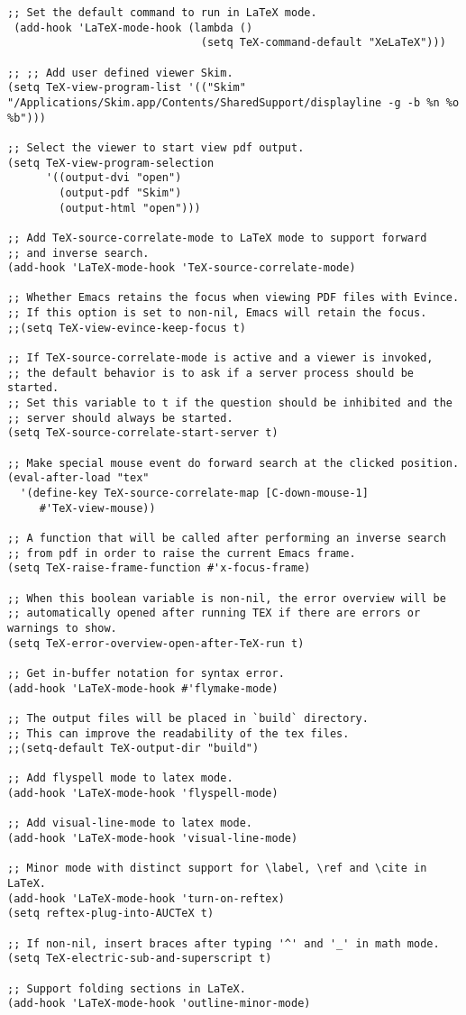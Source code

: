 \begin{lstlisting}
;; Set the default command to run in LaTeX mode.
 (add-hook 'LaTeX-mode-hook (lambda ()
                              (setq TeX-command-default "XeLaTeX")))

;; ;; Add user defined viewer Skim.
(setq TeX-view-program-list '(("Skim" "/Applications/Skim.app/Contents/SharedSupport/displayline -g -b %n %o %b")))

;; Select the viewer to start view pdf output.
(setq TeX-view-program-selection
      '((output-dvi "open")
        (output-pdf "Skim")
        (output-html "open")))

;; Add TeX-source-correlate-mode to LaTeX mode to support forward 
;; and inverse search.
(add-hook 'LaTeX-mode-hook 'TeX-source-correlate-mode)

;; Whether Emacs retains the focus when viewing PDF files with Evince.
;; If this option is set to non-nil, Emacs will retain the focus.
;;(setq TeX-view-evince-keep-focus t)

;; If TeX-source-correlate-mode is active and a viewer is invoked,
;; the default behavior is to ask if a server process should be started.
;; Set this variable to t if the question should be inhibited and the
;; server should always be started.
(setq TeX-source-correlate-start-server t)

;; Make special mouse event do forward search at the clicked position.
(eval-after-load "tex"
  '(define-key TeX-source-correlate-map [C-down-mouse-1]
     #'TeX-view-mouse))

;; A function that will be called after performing an inverse search
;; from pdf in order to raise the current Emacs frame.
(setq TeX-raise-frame-function #'x-focus-frame)

;; When this boolean variable is non-nil, the error overview will be
;; automatically opened after running TEX if there are errors or warnings to show.
(setq TeX-error-overview-open-after-TeX-run t)

;; Get in-buffer notation for syntax error.
(add-hook 'LaTeX-mode-hook #'flymake-mode)

;; The output files will be placed in `build` directory.
;; This can improve the readability of the tex files.
;;(setq-default TeX-output-dir "build")

;; Add flyspell mode to latex mode.
(add-hook 'LaTeX-mode-hook 'flyspell-mode)

;; Add visual-line-mode to latex mode.
(add-hook 'LaTeX-mode-hook 'visual-line-mode)

;; Minor mode with distinct support for \label, \ref and \cite in LaTeX.
(add-hook 'LaTeX-mode-hook 'turn-on-reftex)
(setq reftex-plug-into-AUCTeX t)

;; If non-nil, insert braces after typing '^' and '_' in math mode.
(setq TeX-electric-sub-and-superscript t)

;; Support folding sections in LaTeX.
(add-hook 'LaTeX-mode-hook 'outline-minor-mode)
\end{lstlisting}


